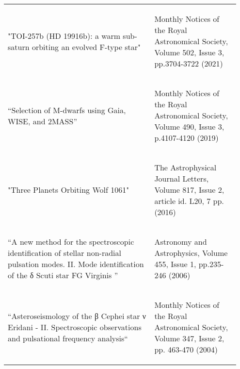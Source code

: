 \begin{tabular}{p{0.6\linewidth} p{0.35\linewidth}}
  \begin{flushright}"TOI-257b (HD 19916b): a warm sub-saturn orbiting an evolved F-type star"\end{flushright} & \begin{flushleft} 
    Monthly Notices of the Royal Astronomical Society, Volume 502, Issue 3, pp.3704-3722 (2021)
\end{flushleft}\\
 \begin{flushright} “Selection of M-dwarfs using Gaia, WISE, and 2MASS” \end{flushright} & \begin{flushleft} Monthly Notices of the Royal Astronomical Society, Volume 490, Issue 3, p.4107-4120 (2019) \end{flushleft} \\
  \begin{flushright} "Three Planets Orbiting Wolf 1061" \end{flushright} & \begin{flushleft} 
    The Astrophysical Journal Letters, Volume 817, Issue 2, article id. L20, 7 pp. (2016) \end{flushleft} \\
  \begin{flushright} “A new method for the spectroscopic identification of stellar non-radial pulsation modes. II. Mode identification of the δ Scuti star FG Virginis ” \end{flushright} & \begin{flushleft} Astronomy and Astrophysics, Volume 455, Issue 1, pp.235-246 (2006)\end{flushleft} \\
  \begin{flushright} “Asteroseismology of the β Cephei star ν Eridani - II. Spectroscopic observations and pulsational frequency analysis“ \end{flushright}  & \begin{flushleft} Monthly Notices of the Royal Astronomical Society, Volume 347, Issue 2, pp. 463-470 (2004) \end{flushleft}\\
\end{tabular}